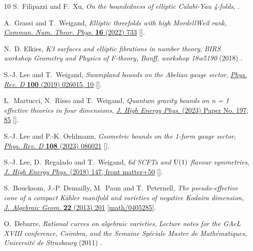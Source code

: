 \documentclass[11pt]{amsart}
\theoremstyle{definition}
\theoremstyle{definition}
\theoremstyle{remark}
\theoremstyle{remark}
\theoremstyle{definition}
\theoremstyle{conjecture}
\begin{document}
\begin{thebibliography}{10}
S.~Filipazzi and F.~Xu, \emph{On the boundedness of elliptic {C}alabi-{Y}au
  4-folds},  \href{https://arxiv.org/abs/2607.27048}{{}}.

A.~Grassi and T.~Weigand, \emph{{Elliptic threefolds with high
  Mordell{\textendash}Weil rank}},
  \href{https://doi.org/10.4310/CNTP.2022.v16.n4.a3}{\emph{Commun. Num. Theor.
  Phys.} {\bfseries 16} (2022) 733}
  [\href{https://arxiv.org/abs/2105.02863}{{}}].

N.~D. Elkies, \emph{{K3} surfaces and elliptic fibrations in number theory},
  {\emph{BIRS workshop {Geometry and Physics of F-theory}, Banff, workshop
  18w5190} (2018) }.

S.-J. Lee and T.~Weigand, \emph{Swampland bounds on the {A}belian gauge
  sector}, \href{https://doi.org/10.1103/physrevd.100.026015}{\emph{Phys. Rev.
  D} {\bfseries 100} (2019) 026015, 10}
  [\href{https://arxiv.org/abs/1905.13213}{{}}].

L.~Martucci, N.~Risso and T.~Weigand, \emph{Quantum gravity bounds on n = 1
  effective theories in four dimensions},
  \href{https://doi.org/10.1007/jhep03(2023)197}{\emph{J. High Energy Phys.}
  (2023) Paper No. 197, 85} [\href{https://arxiv.org/abs/2210.10797}{{}}].

S.-J. Lee and P.-K. Oehlmann, \emph{{Geometric bounds on the 1-form gauge
  sector}}, \href{https://doi.org/10.1103/PhysRevD.108.086021}{\emph{Phys. Rev.
  D} {\bfseries 108} (2023) 086021}
  [\href{https://arxiv.org/abs/2212.11915}{{}}].

S.-J. Lee, D.~Regalado and T.~Weigand, \emph{6d {SCFT}s and {$\rm U(1)$}
  flavour symmetries}, \href{https://doi.org/10.1007/jhep11(2018)147}{\emph{J.
  High Energy Phys.} (2018) 147, front matter+50}
  [\href{https://arxiv.org/abs/1803.07998}{{}}].

S.~Boucksom, J.-P. Demailly, M.~Paun and T.~Peternell, \emph{The
  pseudo-effective cone of a compact {K}\"ahler manifold and varieties of
  negative {K}odaira dimension},
  \href{https://doi.org/10.1090/S1056-3911-2012-00574-8}{\emph{J. Algebraic
  Geom.} {\bfseries 22} (2013) 201}
  [\href{https://arxiv.org/abs/math/0405285}{{\ttfamily math/0405285}}].

O.~Debarre, \emph{Rational curves on algebraic varieties}, {\emph{Lecture notes
  for the {GAeL XVIII} conference, Coimbra, and the Semaine Sp{\'e}ciale Master
  de Math{\'e}matiques, Universit{\'e} de Strasbourg} (2011) }.


\end{thebibliography}
\end{document}
